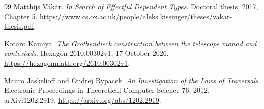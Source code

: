 \documentclass[11pt,letterpaper]{article}
\begin{document}
\begin{thebibliography}{99}
 Matthijs V\'ak\'ar.
\emph{In Search of Effectful Dependent Types}.
Doctoral thesis, 2017, Chapter 5.
\url{https://www.cs.ox.ac.uk/people/aleks.kissinger/theses/vakar-thesis.pdf}.

 Kotaro Kamiya.
\emph{The Grothendieck construction between the telescope monad and contextads}.
Hexagon 2610.00302v1, 17 October 2026.
\url{https://hexagonmath.org/2610.00302v1}.

 Mauro Jaskelioff and Ondrej Rypacek.
\emph{An Investigation of the Laws of Traversals}.
Electronic Proceedings in Theoretical Computer Science 76, 2012.
arXiv:1202.2919.
\url{https://arxiv.org/abs/1202.2919}.
\end{thebibliography}
\end{document}
